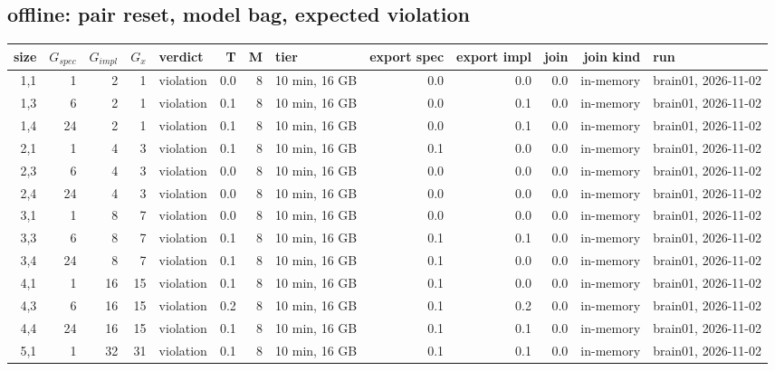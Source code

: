 \documentclass[10pt]{article}
\begin{document}
\subsection*{offline: pair \textsf{reset}, model bag, expected violation}
\begin{longtable}{@{}rrrrlrrlrrrrl@{}}
\toprule
size & $G_{\mathit{spec}}$ & $G_{\mathit{impl}}$ & $G_x$ & verdict & T & M & tier & export spec & export impl & join & join kind & run \\
\midrule
\endhead
\color{red} 1,1 & 1 & 2 & 1 & violation & 0.0 & 8 & 10 min, 16 GB & 0.0 & 0.0 & 0.0 & in-memory & brain01, 2026-11-02 \\
\color{red} 1,3 & 6 & 2 & 1 & violation & 0.1 & 8 & 10 min, 16 GB & 0.0 & 0.1 & 0.0 & in-memory & brain01, 2026-11-02 \\
\color{red} 1,4 & 24 & 2 & 1 & violation & 0.1 & 8 & 10 min, 16 GB & 0.0 & 0.1 & 0.0 & in-memory & brain01, 2026-11-02 \\
\color{red} 2,1 & 1 & 4 & 3 & violation & 0.1 & 8 & 10 min, 16 GB & 0.1 & 0.0 & 0.0 & in-memory & brain01, 2026-11-02 \\
\color{red} 2,3 & 6 & 4 & 3 & violation & 0.0 & 8 & 10 min, 16 GB & 0.0 & 0.0 & 0.0 & in-memory & brain01, 2026-11-02 \\
\color{red} 2,4 & 24 & 4 & 3 & violation & 0.0 & 8 & 10 min, 16 GB & 0.0 & 0.0 & 0.0 & in-memory & brain01, 2026-11-02 \\
\color{red} 3,1 & 1 & 8 & 7 & violation & 0.0 & 8 & 10 min, 16 GB & 0.0 & 0.0 & 0.0 & in-memory & brain01, 2026-11-02 \\
\color{red} 3,3 & 6 & 8 & 7 & violation & 0.1 & 8 & 10 min, 16 GB & 0.1 & 0.1 & 0.0 & in-memory & brain01, 2026-11-02 \\
\color{red} 3,4 & 24 & 8 & 7 & violation & 0.1 & 8 & 10 min, 16 GB & 0.1 & 0.0 & 0.0 & in-memory & brain01, 2026-11-02 \\
\color{red} 4,1 & 1 & 16 & 15 & violation & 0.1 & 8 & 10 min, 16 GB & 0.1 & 0.0 & 0.0 & in-memory & brain01, 2026-11-02 \\
\color{red} 4,3 & 6 & 16 & 15 & violation & 0.2 & 8 & 10 min, 16 GB & 0.1 & 0.2 & 0.0 & in-memory & brain01, 2026-11-02 \\
\color{red} 4,4 & 24 & 16 & 15 & violation & 0.1 & 8 & 10 min, 16 GB & 0.1 & 0.1 & 0.0 & in-memory & brain01, 2026-11-02 \\
\color{red} 5,1 & 1 & 32 & 31 & violation & 0.1 & 8 & 10 min, 16 GB & 0.1 & 0.1 & 0.0 & in-memory & brain01, 2026-11-02 \\

\end{longtable}
\end{document}
